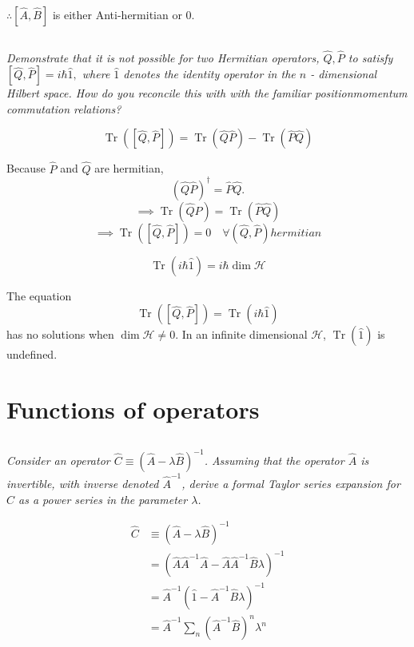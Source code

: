 \documentclass[12pt, letterpaper]{article}
\begin{document}
$\therefore [\hat{A}, \hat{B}]$ is either Anti-hermitian or 0.  


\subsection{}
\textit{Demonstrate that it is not possible for two Hermitian operators, $\hat{Q}, \hat{P}$ to satisfy $[\hat{Q}, \hat{P}]=i \hbar \hat{1},$ where $\hat{1}$ denotes the identity operator in the $n$ - dimensional Hilbert space. How do you reconcile this with with the familiar positionmomentum commutation relations?}

$$
\operatorname{Tr}\left(\left[\hat{Q} , \hat{P}\right]\right)=\operatorname{Tr}(\hat{Q} \hat{P})-\operatorname{Tr}(\hat{P} \hat{Q})
$$

Because $\hat P$ and $\hat Q$ are hermitian, 
$$
\left(\hat Q \hat P\right)^\dagger = \hat P \hat Q. 
$$
$$
\implies \operatorname{Tr}(\hat{Q} \hat{P})=\operatorname{Tr}(\hat{P} \hat{Q})
$$
$$
\implies \operatorname{Tr}\left(\left[\hat{Q} , \hat{P}\right]\right) = 0 \quad \forall(\hat Q, \hat P) hermitian
$$

$$ 
\operatorname{Tr}\left(i \hbar \hat 1\right) = i\hbar \dim \mathcal{H}
$$

The equation
$$
 \operatorname{Tr}\left(\left[\hat{Q} , \hat{P}\right]\right) = \operatorname{Tr}\left(i \hbar \hat 1\right)
$$
has no solutions when $ \dim \mathcal{H} \neq 0$. In an infinite dimensional $\mathcal{H}$, $\operatorname{Tr}\left(\hat 1\right)$ is undefined. 


\section{Functions of operators}
\subsection{}
\textit{Consider an operator $\hat{C} \equiv(\hat{A}-\lambda \hat{B})^{-1}$. Assuming that the operator $\hat{A}$ is invertible, with inverse denoted $\hat{A}^{-1}$, derive a formal Taylor series expansion for $\hat{C}$ as a power series in the parameter $\lambda$.}
 
\begin{align*}
\hat C &\equiv \left(\hat A - \lambda \hat B \right)^{-1} \\
& = \left(\hat{A} \hat{A}^{-1} \hat{A}-\hat{A} \hat{A}^{-1} \hat{B} \lambda\right)^{-1}\\
& = \hat{A}^{-1} \left(\hat 1 -  \hat{A}^{-1} \hat{B} \lambda\right)^{-1}\\
& = \hat{A}^{-1} \sum_n \left(\hat{A}^{-1} \hat{B}\right)^n \lambda^n\\
\end{align*}
\end{document}

